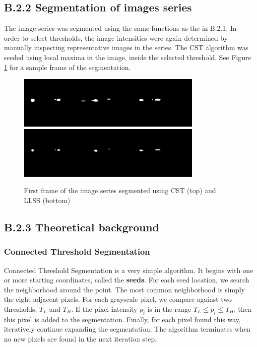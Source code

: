 \documentclass{article}
\begin{document}
\subsection*{B.2.2 Segmentation of images series}

The image series was segmented using the same functions as the in B.2.1. In order to select thresholds, the image intensities were again determined by manually inspecting representative images in the series. The CST algorithm was seeded using local maxima in the image, inside the selected threshold. See Figure \ref{fig:b21_imageseries} for a sample frame of the segmentation.

\begin{figure}
\centering
\includegraphics[width=0.8\textwidth]{figures/MitoGFP_LgtGal4_a01r01s02001_sct.png}
\includegraphics[width=0.8\textwidth]{figures/MitoGFP_LgtGal4_a01r01s02001_slls.png}
\caption{First frame of the image series segmented using CST (top) and LLSS (bottom)}
\label{fig:b21_imageseries}
\end{figure}


\subsection*{B.2.3 Theoretical background}

\subsubsection*{Connected Threshold Segmentation}
Connected Threshold Segmentation is a very simple algorithm. It begins with one or more starting coordinates, called the {\bf seeds}. For each seed location, we search the neighborhood around the point. The most common neighborhood is simply the eight adjacent pixels. For each grayscale pixel, we compare against two thresholds, $T_L$ and $T_H$. If the pixel intensity $p_i$ is in the range $T_L \leq p_i \leq T_H$, then this pixel is added to the segmentation. Finally, for each pixel found this way, iteratively continue expanding the segmentation. The algorithm terminates when no new pixels are found in the next iteration step.\cite{svi}
\end{document}
